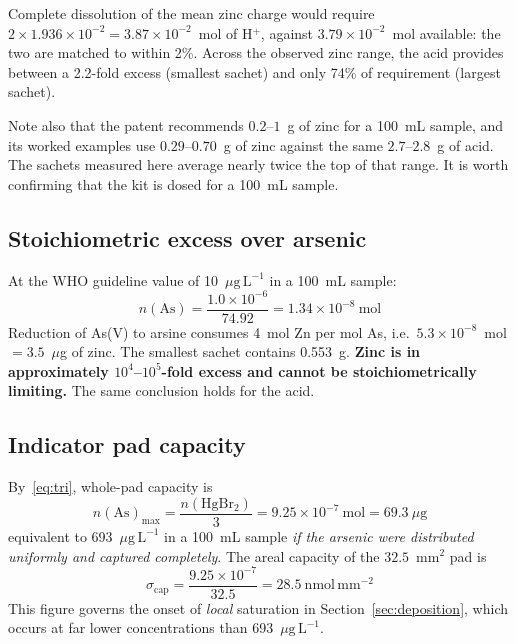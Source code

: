 \documentclass[11pt,a4paper]{article}
\newcommand{\ptl}{\ensuremath{\mu\mathrm{g\,L^{-1}}}}
\begin{document}
Complete dissolution of the mean zinc charge would require
$2 \times 1.936\times10^{-2} = 3.87\times10^{-2}$~mol of H$^+$, against
$3.79\times10^{-2}$~mol available: the two are matched to within 2\%.
Across the observed zinc range, the acid provides between a 2.2-fold excess
(smallest sachet) and only 74\% of requirement (largest sachet).

Note also that the patent recommends $0.2$--$1$~g of zinc for a 100~mL
sample, and its worked examples use $0.29$--$0.70$~g of zinc against the
same $2.7$--$2.8$~g of acid. The sachets measured here average nearly twice
the top of that range. It is worth confirming that the kit is dosed for a
100~mL sample.

\subsection{Stoichiometric excess over arsenic}

At the WHO guideline value of 10~\ptl{} in a 100~mL sample:
\begin{equation}
  n(\mathrm{As}) = \frac{1.0\times10^{-6}}{74.92}
  = 1.34\times10^{-8}\ \mathrm{mol}
\end{equation}
Reduction of As(V) to arsine consumes 4~mol Zn per mol As, i.e.\
$5.3\times10^{-8}$~mol $= 3.5$~\ensuremath{\mu}g of zinc. The smallest
sachet contains 0.553~g. \textbf{Zinc is in approximately
$10^{4}$--$10^{5}$-fold excess and cannot be stoichiometrically limiting.}
The same conclusion holds for the acid.

\subsection{Indicator pad capacity}
\label{sec:padcap}

By~\eqref{eq:tri}, whole-pad capacity is
\begin{equation}
  n(\mathrm{As})_{\max} = \frac{n(\mathrm{HgBr_2})}{3}
  = 9.25\times10^{-7}\ \mathrm{mol} = 69.3\ \ensuremath{\mu}\mathrm{g}
\end{equation}
equivalent to 693~\ptl{} in a 100~mL sample \emph{if the arsenic were
distributed uniformly and captured completely}. The areal capacity of the
$32.5$~mm$^2$ pad is
\begin{equation}
  \sigma_{\text{cap}} = \frac{9.25\times10^{-7}}{32.5}
  = 28.5\ \mathrm{nmol\,mm^{-2}}
  \label{eq:sigmacap}
\end{equation}
This figure governs the onset of \emph{local} saturation in
Section~\ref{sec:deposition}, which occurs at far lower concentrations than
693~\ptl{}.
\end{document}
